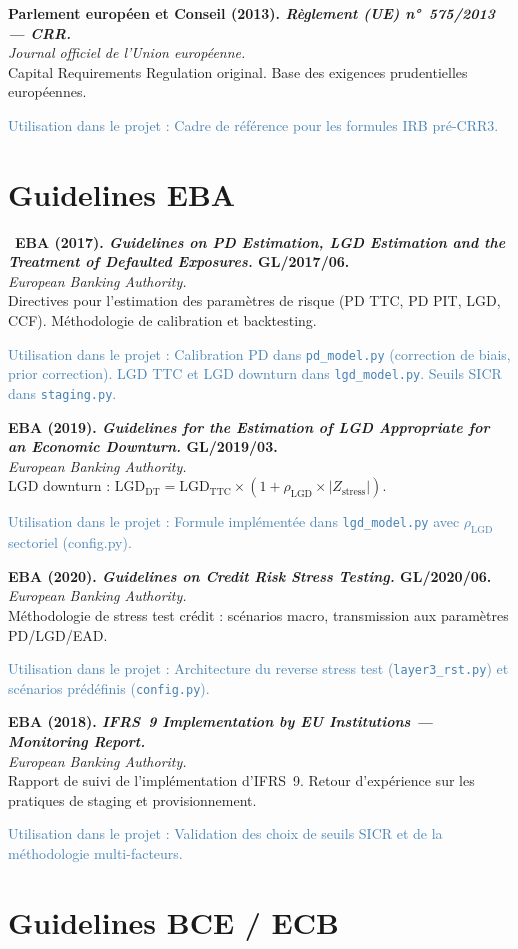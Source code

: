 \documentclass[12pt,a4paper]{article}
\newcommand{\bibentry}[4]{%
  \noindent\textbf{#1}\\
  \textit{#2}\\
  #3\par
  \textcolor{steelblue}{\footnotesize\textsf{Utilisation dans le projet :} #4}\par
  \medskip
}
\newcommand{\bibentrystar}[4]{%
  \noindent{\color{goldstar}$\bigstar$}~\textbf{#1}\\
  \textit{#2}\\
  #3\par
  \textcolor{steelblue}{\footnotesize\textsf{Utilisation dans le projet :} #4}\par
  \medskip
}
\begin{document}
\bibentry{Parlement européen et Conseil (2013). \emph{Règlement (UE) n°~575/2013 --- CRR.}}{Journal officiel de l'Union européenne.}{Capital Requirements Regulation original. Base des exigences prudentielles européennes.}{Cadre de référence pour les formules IRB pré-CRR3.}

\section{Guidelines EBA}

\bibentrystar{EBA (2017). \emph{Guidelines on PD Estimation, LGD Estimation and the Treatment of Defaulted Exposures.} GL/2017/06.}{European Banking Authority.}{Directives pour l'estimation des paramètres de risque (PD TTC, PD PIT, LGD, CCF). Méthodologie de calibration et backtesting.}{Calibration PD dans \texttt{pd\_model.py} (correction de biais, prior correction). LGD TTC et LGD downturn dans \texttt{lgd\_model.py}. Seuils SICR dans \texttt{staging.py}.}

\bibentry{EBA (2019). \emph{Guidelines for the Estimation of LGD Appropriate for an Economic Downturn.} GL/2019/03.}{European Banking Authority.}{LGD downturn : $\text{LGD}_\text{DT} = \text{LGD}_\text{TTC} \times (1 + \rho_\text{LGD} \times |Z_\text{stress}|)$.}{Formule implémentée dans \texttt{lgd\_model.py} avec $\rho_\text{LGD}$ sectoriel (config.py).}

\bibentry{EBA (2020). \emph{Guidelines on Credit Risk Stress Testing.} GL/2020/06.}{European Banking Authority.}{Méthodologie de stress test crédit : scénarios macro, transmission aux paramètres PD/LGD/EAD.}{Architecture du reverse stress test (\texttt{layer3\_rst.py}) et scénarios prédéfinis (\texttt{config.py}).}

\bibentry{EBA (2018). \emph{IFRS~9 Implementation by EU Institutions --- Monitoring Report.}}{European Banking Authority.}{Rapport de suivi de l'implémentation d'IFRS~9. Retour d'expérience sur les pratiques de staging et provisionnement.}{Validation des choix de seuils SICR et de la méthodologie multi-facteurs.}

\section{Guidelines BCE / ECB}
\end{document}
